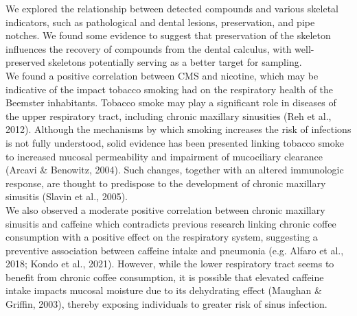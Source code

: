\documentclass[
]{article}
\begin{document}
We explored the relationship between detected compounds and various
skeletal indicators, such as pathological and dental lesions,
preservation, and pipe notches. We found some evidence to suggest that
preservation of the skeleton influences the recovery of compounds from
the dental calculus, with well-preserved skeletons potentially serving
as a better target for sampling.\\
We found a positive correlation between CMS and nicotine, which may be
indicative of the impact tobacco smoking had on the respiratory health
of the Beemster inhabitants. Tobacco smoke may play a significant role
in diseases of the upper respiratory tract, including chronic maxillary
sinusities (Reh et al., 2012). Although the mechanisms by which smoking
increases the risk of infections is not fully understood, solid evidence
has been presented linking tobacco smoke to increased mucosal
permeability and impairment of mucociliary clearance (Arcavi \&
Benowitz, 2004). Such changes, together with an altered immunologic
response, are thought to predispose to the development of chronic
maxillary sinusitis (Slavin et al., 2005).\\
We also observed a moderate positive correlation between chronic
maxillary sinusitis and caffeine which contradicts previous research
linking chronic coffee consumption with a positive effect on the
respiratory system, suggesting a preventive association between caffeine
intake and pneumonia (e.g. Alfaro et al., 2018; Kondo et al., 2021).
However, while the lower respiratory tract seems to benefit from chronic
coffee consumption, it is possible that elevated caffeine intake impacts
mucosal moisture due to its dehydrating effect (Maughan \& Griffin,
2003), thereby exposing individuals to greater risk of sinus infection.
\end{document}
